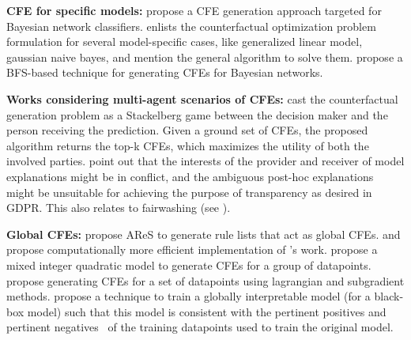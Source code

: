 \textbf{CFE for specific models: }
\citet{bayesian-network-CFE} propose a CFE generation approach targeted for Bayesian network classifiers. 
\citet{artelt_computation_2019, efficient-contrastive} enlists the counterfactual optimization problem formulation for several model-specific cases, like generalized linear model, gaussian naive bayes, and mention the general algorithm to solve them. 
\citet{Koopman2021PersuasiveCE} propose a BFS-based technique for generating CFEs for Bayesian networks. 

\textbf{Works considering multi-agent scenarios of CFEs: }
\citet{Manuel:game-theory} cast the counterfactual generation problem as a Stackelberg game between the decision maker and the person receiving the prediction. Given a ground set of CFEs, the proposed algorithm returns the top-k CFEs, which maximizes the utility of both the involved parties. 
\citet{post-hoc-CFE-not-good} point out that the interests of the provider and receiver of model explanations might be in conflict, and the ambiguous post-hoc explanations might be unsuitable for achieving the purpose of transparency as desired in GDPR. This also relates to fairwashing (see ). 


\textbf{Global CFEs: } 
\citet{hima-beyond-recourse-globalcfe} propose AReS to generate rule lists that act as global CFEs. \citet{ley-global-cfe-ares-improve} and \citet{kanamori-decision-tree-globalcfe} propose computationally more efficient implementation of \citet{hima-beyond-recourse-globalcfe}'s work.  \citet{carrizosa-global-cfe-tree-models} propose a mixed integer quadratic model to generate CFEs for a group of datapoints. 
\citet{inverse-classification-multiple-algos} propose generating CFEs for a set of datapoints using lagrangian and subgradient methods. 
\citet{Dhurandhar-global-model-consistent-with-cfe} propose a technique to train a globally interpretable model (for a black-box model) such that this model is consistent with the pertinent positives and pertinent negatives~\citep{dhurandhar_explanations_2018} of the training datapoints used to train the original model. 


